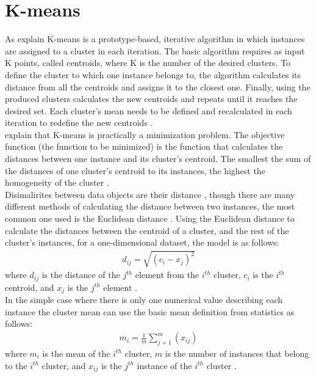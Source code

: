 \section{K-means}
As \textcite{dunham, tanSteinKum} explain K-means is a prototype-based, iterative algorithm in which instances are assigned to a cluster in each iteration. The basic algorithm requires as input K points, called centroids, where K is the number of the desired clusters. To define the cluster to which one instance belongs to, the algorithm calculates its distance from all the centroids and assigns it to the closest one. Finally, using the produced clusters calculates the new centroids and repeats until it reaches the desired set. Each cluster's mean needs to be defined and recalculated in each iteration to redefine the new centroids \autocite{dunham, tanSteinKum}. \\
\textcite{euclidean} explain that K-means is practically a minimization problem. The objective function (the function to be minimized) is the function that calculates the distances between one instance and its cluster's centroid. The smallest the sum of the distances of one cluster's centroid to its instances, the highest the homogeneity of the cluster \autocite[2]{euclidean}. \\
Disimalirites between data objects are their distance \autocite[69]{tanSteinKum}, though there are many different methods of calculating the distance between two instances, the most common one used is the Euclidean distance \autocite[648]{survey}. Using the Euclidean distance to calculate the distances between the centroid of a cluster, and the rest of the cluster's instances, for a one-dimensional dataset, the model is as follows:
\begin{eqnarray*}
d_{ij} = \sqrt{(c_{i}-x_{j})^2}
\end{eqnarray*}
where \(d_{ij}\) is the distance of the \(j^{th}\) element from the \(i^{th}\) cluster, \(c_{i}\) is the \(i^{th}\) centroid, and \(x_{j}\) is the \(j^{th}\) element \autocite[69]{tanSteinKum}. \\
In the simple case where there is only one numerical value describing each instance the cluster mean can use the basic mean definition from statistics as follows: \\
\begin{eqnarray*}
m_{i} = \frac{1}{m}\sum_{j=1}^{m}(x_{ij})
\end{eqnarray*}
where \(m_{i}\) is the mean of the \(i^{th}\) cluster, \(m\) is the number of instances that belong to the \(i^{th}\) cluster, and \(x_{ij}\) is the \(j^{th}\) instance of the \(i^{th}\) cluster \autocite[140]{dunham}. \\
